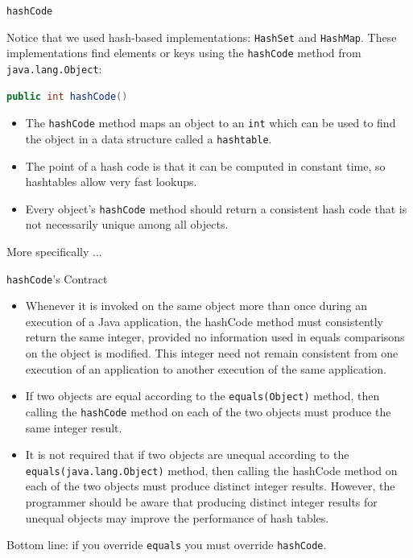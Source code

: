 \documentclass{beamer}
\begin{document}
\begin{frame}[fragile]{{\tt hashCode}}

Notice that we used hash-based implementations: {\tt HashSet} and {\tt HashMap}.  These implementations find elements or keys using the {\tt hashCode} method from {\tt java.lang.Object}:

\begin{lstlisting}[language=Java]
public int hashCode()
\end{lstlisting}
\begin{itemize}
\item The {\tt hashCode} method maps an object to an {\tt int} which can be used to find the object in a data structure called a {\tt hashtable}.
\item The point of a hash code is that it can be computed in constant time, so hashtables allow very fast lookups.
\item Every object's {\tt hashCode} method should return a consistent hash code that  is not necessarily unique among all objects.
\end{itemize}

More specifically ...

\end{frame}

\begin{frame}[fragile]{{\tt hashCode}'s Contract}
\vspace{-.12in}
\begin{itemize}
\item Whenever it is invoked on the same object more than once during an execution of a Java application, the hashCode method must consistently return the same integer, provided no information used in equals comparisons on the object is modified. This integer need not remain consistent from one execution of an application to another execution of the same application.
\item If two objects are equal according to the {\tt equals(Object)} method, then calling the {\tt hashCode} method on each of the two objects must produce the same integer result.
\item It is not required that if two objects are unequal according to the {\tt equals(java.lang.Object)} method, then calling the hashCode method on each of the two objects must produce distinct integer results. However, the programmer should be aware that producing distinct integer results for unequal objects may improve the performance of hash tables.
\end{itemize}
\vspace{-.05in}
Bottom line: if you override {\tt equals} you must override {\tt hashCode}.\\

\end{frame}
\end{document}
